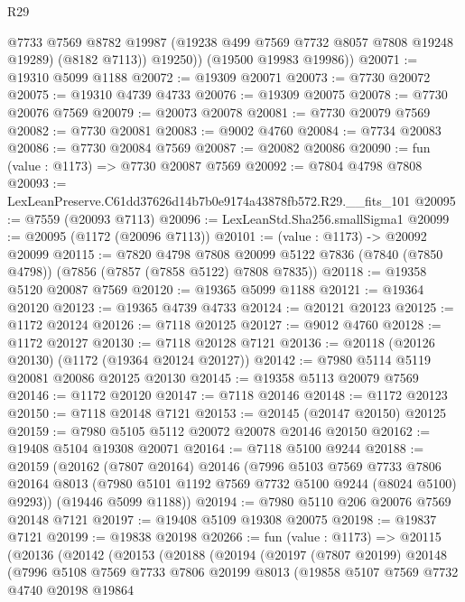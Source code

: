 \begin{lexlean}{R29}
\begin{coremodule}
            @7733
            @7569
            @8782
            @19987
            (@19238 @499 @7569 @7732 @8057 @7808 @19248 @19289)
            (@8182 @7113))
          @19250))
      (@19500 @19983 @19986))
@20071 := @19310 @5099 @1188
@20072 := @19309 @20071
@20073 := @7730 @20072
@20075 := @19310 @4739 @4733
@20076 := @19309 @20075
@20078 := @7730 @20076 @7569
@20079 := @20073 @20078
@20081 := @7730 @20079 @7569
@20082 := @7730 @20081
@20083 := @9002 @4760
@20084 := @7734 @20083
@20086 := @7730 @20084 @7569
@20087 := @20082 @20086
@20090 := fun (value : @1173) => @7730 @20087 @7569
@20092 := @7804 @4798 @7808
@20093 := LexLeanPreserve.C61dd37626d14b7b0e9174a43878fb572.R29.__fits_101
@20095 := @7559 (@20093 @7113)
@20096 := LexLeanStd.Sha256.smallSigma1
@20099 := @20095 (@1172 (@20096 @7113))
@20101 := (value : @1173) -> @20092 @20099
@20115 := @7820
    @4798
    @7808
    @20099
    @5122
    @7836
    (@7840 (@7850 @4798))
    (@7856 (@7857 (@7858 @5122) @7808 @7835))
@20118 := @19358 @5120 @20087 @7569
@20120 := @19365 @5099 @1188
@20121 := @19364 @20120
@20123 := @19365 @4739 @4733
@20124 := @20121 @20123
@20125 := @1172 @20124
@20126 := @7118 @20125
@20127 := @9012 @4760
@20128 := @1172 @20127
@20130 := @7118 @20128 @7121
@20136 := @20118 (@20126 @20130) (@1172 (@19364 @20124 @20127))
@20142 := @7980 @5114 @5119 @20081 @20086 @20125 @20130
@20145 := @19358 @5113 @20079 @7569
@20146 := @1172 @20120
@20147 := @7118 @20146
@20148 := @1172 @20123
@20150 := @7118 @20148 @7121
@20153 := @20145 (@20147 @20150) @20125
@20159 := @7980 @5105 @5112 @20072 @20078 @20146 @20150
@20162 := @19408 @5104 @19308 @20071
@20164 := @7118 @5100 @9244
@20188 := @20159
    (@20162
      (@7807 @20164)
      @20146
      (@7996
        @5103
        @7569
        @7733
        @7806
        @20164
        @8013
        (@7980 @5101 @1192 @7569 @7732 @5100 @9244 (@8024 @5100) @9293))
      (@19446 @5099 @1188))
@20194 := @7980 @5110 @206 @20076 @7569 @20148 @7121
@20197 := @19408 @5109 @19308 @20075
@20198 := @19837 @7121
@20199 := @19838 @20198
@20266 := fun (value : @1173) =>
  @20115
    (@20136
      (@20142
        (@20153
          (@20188
            (@20194
              (@20197
                (@7807 @20199)
                @20148
                (@7996
                  @5108
                  @7569
                  @7733
                  @7806
                  @20199
                  @8013
                  (@19858
                    @5107
                    @7569
                    @7732
                    @4740
                    @20198
                    @19864

\end{coremodule}
\end{lexlean}
